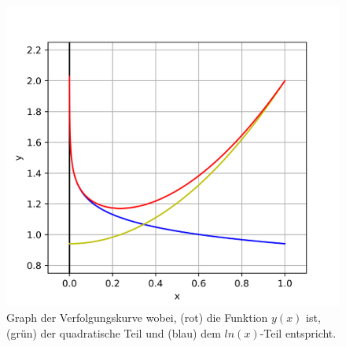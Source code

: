 \begin{figure}
	\centering
	\includegraphics{papers/lambertw/Bilder/VerfolgungskurveBsp.png}
	\caption[Graph der Verfolgungskurve]{Graph der Verfolgungskurve wobei, ({\color{red}rot}) die Funktion \ensuremath{y(x)} ist, ({\color{darkgreen}grün}) der quadratische Teil und ({\color{blue}blau}) dem \ensuremath{ln(x)}-Teil entspricht.
	\label{lambertw:BildFunkLoes}
	}
\end{figure}

